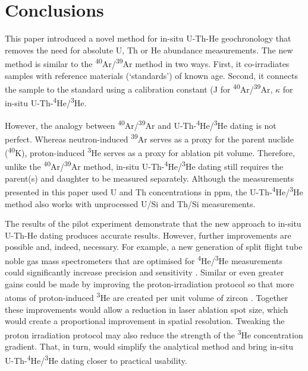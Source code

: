 \documentclass{article}
\begin{document}
\section{Conclusions}

This paper introduced a novel method for in-situ U-Th-He geochronology
that removes the need for absolute U, Th or He abundance
measurements. The new method is similar to the
\textsuperscript{40}Ar/\textsuperscript{39}Ar method in two
ways. First, it co-irradiates samples with reference materials
(`standards') of known age.  Second, it connects the sample to the
standard using a calibration constant (J for
\textsuperscript{40}Ar/\textsuperscript{39}Ar, $\kappa$ for in-situ
U-Th-\textsuperscript{4}He/\textsuperscript{3}He.\medskip

However, the analogy between
\textsuperscript{40}Ar/\textsuperscript{39}Ar and
U-Th-\textsuperscript{4}He/\textsuperscript{3}He dating is not
perfect.  Whereas neutron-induced \textsuperscript{39}Ar serves as a
proxy for the parent nuclide (\textsuperscript{40}K), proton-induced
\textsuperscript{3}He serves as a proxy for ablation pit
volume. Therefore, unlike the
\textsuperscript{40}Ar/\textsuperscript{39}Ar method, in-situ
U-Th-\textsuperscript{4}He/\textsuperscript{3}He dating still requires
the parent(s) and daughter to be measured separately. Although the
measurements presented in this paper used U and Th concentrations in
ppm, the U-Th-\textsuperscript{4}He/\textsuperscript{3}He method also
works with unprocessed U/Si and Th/Si measurements.\medskip

The results of the pilot experiment demonstrate that the new approach
to in-situ U-Th-He dating produces accurate results. However, further
improvements are possible and, indeed, necessary. For example, a new
generation of split flight tube noble gas mass spectrometers that are
optimised for \textsuperscript{4}He/\textsuperscript{3}He measurements
could significantly increase precision and sensitivity
\citep[e.g.,][]{brennan2020}. Similar or even greater gains could be
made by improving the proton-irradiation protocol so that more atoms
of proton-induced \textsuperscript{3}He are created per unit volume of
zircon \citep{colleps2022}. Together these improvements would allow a
reduction in laser ablation spot size, which would create a
proportional improvement in spatial resolution. Tweaking the proton
irradiation protocol may also reduce the strength of the
\textsuperscript{3}He concentration gradient. That, in turn, would
simplify the analytical method and bring in-situ
U-Th-\textsuperscript{4}He/\textsuperscript{3}He dating closer to
practical usability.
\end{document}
